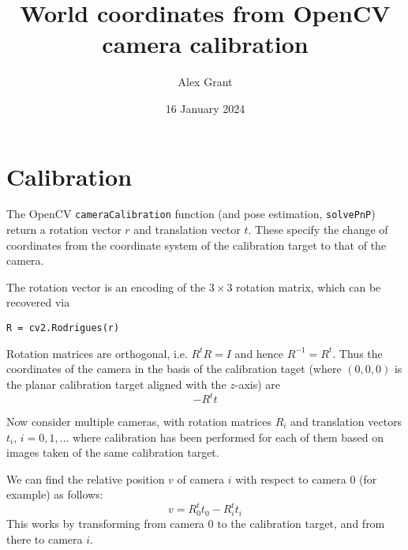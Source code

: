 \documentclass{article}
\title{World coordinates from OpenCV camera calibration}
\author{Alex Grant}
\date{16 January 2024}
\begin{document}
\maketitle

\section{Calibration}

The OpenCV \texttt{cameraCalibration} function (and pose estimation, \texttt{solvePnP}) return a rotation vector $r$ and translation vector $t$. These specify the change of coordinates from the coordinate system of the calibration target to that of the camera.

The rotation vector is an encoding of the $3\times 3$ rotation matrix, which can be recovered via
\begin{verbatim}
R = cv2.Rodrigues(r)
\end{verbatim}
Rotation matrices are orthogonal, i.e. $R^t R = I$ and hence $R^{-1} = R^t$. Thus the coordinates of the camera in the basis of the calibration taget (where $(0,0,0)$ is the planar calibration target aligned with the $z$-axis) are
\begin{equation*}
  -R^t t
\end{equation*}

Now consider multiple cameras, with rotation matrices $R_i$ and translation vectors $t_i$, $i=0,1,\dots$ where calibration has been performed for each of them based on images taken of the same calibration target.

We can find the relative position $v$ of camera $i$ with respect to camera $0$ (for example) as follows:
\begin{equation*}
  v = R_0^t t_0 - R_i^t t_i
\end{equation*}
This works by transforming from camera $0$ to the calibration target, and from there to camera $i$.
\end{document}
